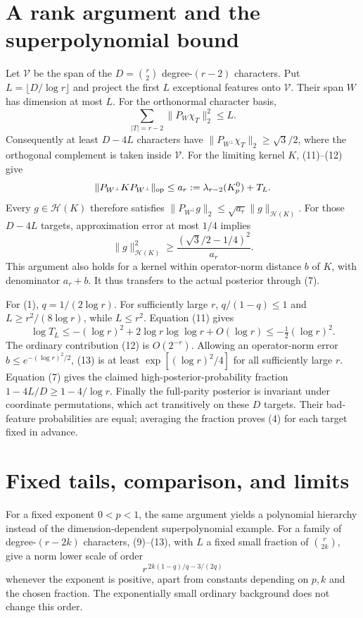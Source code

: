 \documentclass[11pt]{article}
\begin{document}
\section{A rank argument and the superpolynomial bound}
Let $\mathcal V$ be the span of the $D=\binom r2$ degree-$(r-2)$
characters. Put $L=\lfloor D/\log r\rfloor$ and project the first
$L$ exceptional features onto $\mathcal V$. Their span $W$ has
dimension at most $L$. For the orthonormal character basis,
\[
 \sum_{|T|=r-2}\|P_W\chi_T\|_2^2\le L.
\]
Consequently at least $D-4L$ characters have
$\|P_{W^\perp}\chi_T\|_2\ge\sqrt3/2$, where the orthogonal complement
is taken inside $\mathcal V$.
For the limiting kernel $K$, (11)--(12) give
\[
 \|P_{W^\perp}KP_{W^\perp}\|_{\rm op}
                         \le a_r:=\lambda_{r-2}(K_p^0)+T_L.
\]
Every $g\in\mathcal H(K)$ therefore satisfies
$\|P_{W^\perp}g\|_2\le\sqrt{a_r}\|g\|_{\mathcal H(K)}$.
For those $D-4L$ targets, approximation error at most $1/4$ implies
\[
 \|g\|_{\mathcal H(K)}^2
          \ge\frac{(\sqrt3/2-1/4)^2}{a_r}.              \tag{13}
\]
This argument also holds for a kernel within operator-norm distance
$b$ of $K$, with denominator $a_r+b$. It thus transfers to the actual
posterior through (7).

For (1), $q=1/(2\log r)$. For sufficiently large $r$,
$q/(1-q)\le1$ and $L\ge r^2/(8\log r)$, while $L\le r^2$.
Equation (11) gives
\[
 \log T_L
 \le-(\log r)^2+2\log r\log\log r+O(\log r)
 \le-\tfrac12(\log r)^2.
\]
The ordinary contribution (12) is $O(2^{-r})$.
Allowing an operator-norm error $b\le e^{-(\log r)^2/2}$, (13) is
at least $\exp[(\log r)^2/4]$ for all sufficiently large $r$.
Equation (7) gives the claimed high-posterior-probability fraction
$1-4L/D\ge1-4/\log r$.
Finally the full-parity posterior is invariant under coordinate
permutations, which act transitively on these $D$ targets.
Their bad-feature probabilities are equal; averaging the fraction proves
(4) for each target fixed in advance.

\section{Fixed tails, comparison, and limits}
For a fixed exponent $0<p<1$, the same argument yields a polynomial
hierarchy instead of the dimension-dependent superpolynomial example.
For a family of degree-$(r-2k)$ characters, (9)--(13), with
$L$ a fixed small fraction of $\binom r{2k}$, give a norm lower scale
of order
\[
 r^{\,2k(1-q)/q-3/(2q)}
\]
whenever the exponent is positive, apart from constants depending on
$p,k$ and the chosen fraction. The exponentially small ordinary
background does not change this order.
\end{document}
